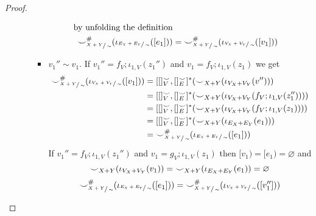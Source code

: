 \begin{proof}
\begin{itemize}
\begin{itemize}
\begin{itemize}
\begin{align*}
                        \text{by unfolding the definition}\\
                        {\smile}_{\sfrac{X+Y}{\sim}}^{{\#}}(\iota_{\sfrac{E_{X} + E_{Y}}{\sim}}([e_1])) &= {\smile}_{\sfrac{X+Y}{\sim}}^{{\#}}(\iota_{\sfrac{V_{X} + V_{Y}}{\sim}}([v_1]))\\
                        \end{align*} 
                      \fi
                \item $v_1'' \sim v_1$. If $v_1'' = f_{V};\iota_{1,V}(z_1'')$ and $v_1 = f_{V};\iota_{1,V}(z_1)$ we get
                    \begin{align*}
                        {\smile}_{\sfrac{X+Y}{\sim}}^{{\#}}(\iota_{\sfrac{V_{X} + V_{Y}}{\sim}}([v_1])) &= [[]_{V}^{{\smile}},[]_{E}^{{\smile}}]^{*}({\smile}_{X+Y}(\iota_{V_{X} + V_{Y}}(v'')))\\
                                                                                                                &= [[]_{V}^{{\smile}},[]_{E}^{{\smile}}]^{*}({\smile}_{X+Y}(\iota_{V_{X} + V_{Y}}(f_{V};\iota_{1,V}(z_1''))))\\
                                                                                                                &= [[]_{V}^{{\smile}},[]_{E}^{{\smile}}]^{*}({\smile}_{X+Y}(\iota_{V_{X} + V_{Y}}(f_{V};\iota_{1,V}(z_1))))\\
                                                                                                                &= [[]_{V}^{{\smile}},[]_{E}^{{\smile}}]^{*}({\smile}_{X+Y}(\iota_{E_{X} + E_{Y}}(e_1)))\\
                                                                                                                &= {\smile}_{\sfrac{X+Y}{\sim}}^{{\#}}(\iota_{\sfrac{E_{X} + E_{Y}}{\sim}}([e_1]))
                    \end{align*}
                    If $v_1'' = f_{V};\iota_{1,V}(z_1'')$ and $v_1 = g_{V};\iota_{1,V}(z_1)$ then $[v_1) = [e_1) = \varnothing$ and 
                    \[
                        {\smile}_{X+Y}(\iota_{V_{X} + V_{Y}}(v_1)) = {\smile}_{X+Y}(\iota_{E_{X} + E_{Y}}(e_1)) = \varnothing
                    \]
                    \begin{align*}
                    \consistency_{\sfrac{X+Y}{\sim}}^{\hashtag}(\iota_{\sfrac{E_{X} + E_{Y}}{\sim}}([e_1])) &= \consistency_{\sfrac{X+Y}{\sim}}^{\hashtag}(\iota_{\sfrac{V_{X} + V_{Y}}{\sim}}([v_1'']))\\

\end{align*}
\end{itemize}
\end{itemize}
\end{itemize}
\end{proof}
